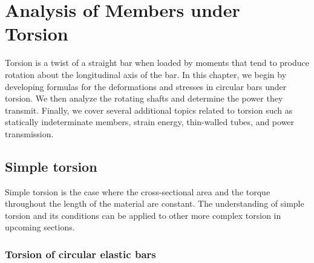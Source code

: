 \documentclass[
fontsize=10pt,
a4paper,
twosides=false,
open=any,
svgnames,
]{kaobook} %
\begin{document}
\begin{exercises}
  \begin{figure}[H]
    \centering
    \centering
  \end{figure}

\end{exercises}

\chapter{Analysis of Members under Torsion}

Torsion is a twist of a straight bar when loaded by moments that tend to produce rotation about the longitudinal axis of the bar. In this chapter, we begin by developing formulas for the deformations and stresses in circular bars under torsion. We then analyze the rotating shafts and determine the power they transmit. Finally, we cover several additional topics related to torsion such as statically indeterminate members, strain energy, thin-walled tubes, and power transmission.

\section{Simple torsion}

Simple torsion is the case where the cross-sectional area and the torque throughout the length of the material are constant. The understanding of simple torsion and its conditions can be applied to other more complex torsion in upcoming sections.

\subsection{Torsion of circular elastic bars}
\end{document}
